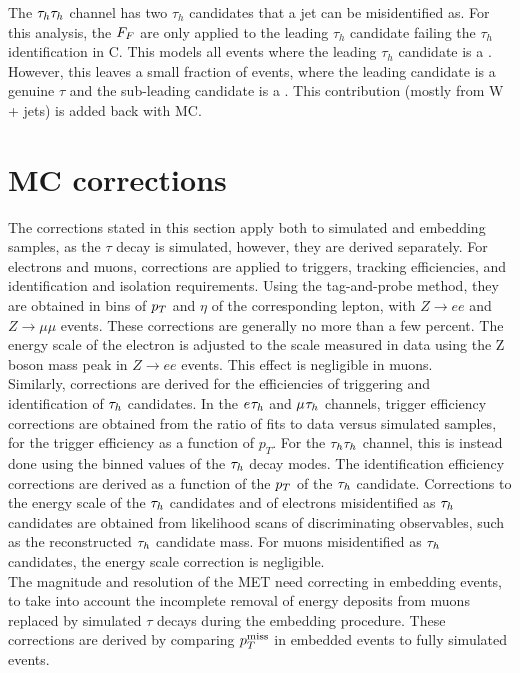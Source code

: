 The $\tau_{h}\tau_{h}$ channel has two $\tau_h$ candidates that a jet can be misidentified as.
For this analysis, the $F_{F}$ are only applied to the leading $\tau_h$ candidate failing the $\tau_h$ identification in C.
This models all events where the leading $\tau_h$ candidate is a \jtth.
However, this leaves a small fraction of events, where the leading candidate is a genuine $\tau$ and the sub-leading candidate is a \jtth.
This contribution (mostly from W + jets) is added back with \ac{MC}.

\section{MC corrections}
\label{sec:ditau_corrections}

The corrections stated in this section apply both to simulated and embedding samples, as the $\tau$ decay is simulated, however, they are derived separately. 
For electrons and muons, corrections are applied to triggers, tracking efficiencies, and identification and isolation requirements.
Using the tag-and-probe method, they are obtained in bins of $p_{T}$ and $\eta$ of the corresponding lepton, with $Z\rightarrow ee$ and $Z\rightarrow\mu\mu$ events. 
These corrections are generally no more than a few percent. 
The energy scale of the electron is adjusted to the scale measured in data using the Z boson mass peak in $Z\rightarrow ee$ events. 
This effect is negligible in muons. \\

Similarly, corrections are derived for the efficiencies of triggering and identification of $\tau_{h}$ candidates. 
In the $e_{}\tau_{h}$ and $\mu_{}\tau_{h}$ channels, trigger efficiency corrections are obtained from the ratio of fits to data versus simulated samples, for the trigger efficiency as a function of $p_{T}$. 
For the $\tau_{h}\tau_{h}$ channel, this is instead done using the binned values of the $\tau_{h}$ decay modes.
The identification efficiency corrections are derived as a function of the $p_{T}$ of the $\tau_{h}$ candidate. 
Corrections to the energy scale of the $\tau_{h}$ candidates and of electrons misidentified as $\tau_{h}$ candidates are obtained from likelihood scans of discriminating observables, such as the reconstructed $\tau_{h}$ candidate mass. 
For muons misidentified as $\tau_{h}$ candidates, the energy scale correction is negligible. \\

The magnitude and resolution of the \ac{MET} need correcting in embedding events, to take into account the incomplete removal of energy deposits from muons replaced by simulated $\tau$ decays during the embedding procedure. 
These corrections are derived by comparing $p_{T}^{\text{miss}}$ in embedded events to fully simulated events. \\

